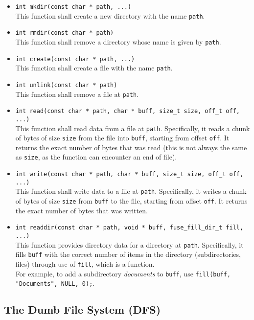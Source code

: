 \documentclass [a4,twoside,11pt] {article}
\begin{document}
    \begin{itemize}
        \item \texttt{int mkdir(const char * path, ...)}\\
        This function shall create a new directory with the name \texttt{path}.
        \item \texttt{int rmdir(const char * path)}\\
        This function shall remove a directory whose name is given by \texttt{path}.
        \item \texttt{int create(const char * path, ...)}\\
        This function shall create a file with the name \texttt{path}.
        \item \texttt{int unlink(const char * path)}\\
        This function shall remove a file at \texttt{path}.
        \item \texttt{int read(const char * path, char * buff, size\_t size, off\_t off, ...)}\\
        This function shall read data from a file at \texttt{path}. Specifically, it reads a chunk of bytes of size \texttt{size} from the file into \texttt{buff}, starting from offset \texttt{off}. It returns the exact number of bytes that was read (this is not always the same as \texttt{size}, as the function can encounter an end of file).
        \item \texttt{int write(const char * path, char * buff, size\_t size, off\_t off, ...)}\\
        This function shall write data to a file at \texttt{path}. Specifically, it writes a chunk of bytes of size \texttt{size} from \texttt{buff} to the file, starting from offset \texttt{off}. It returns the exact number of bytes that was written.
        \item \texttt{int readdir(const char * path, void * buff, fuse\_fill\_dir\_t fill, ...)}\\
        This function provides directory data for a directory at \texttt{path}. Specifically, it fills \texttt{buff} with the correct number of items in the directory (subdirectories, files) through use of \texttt{fill}, which is a function.\\
        For example, to add a subdirectory \textit{documents} to \texttt{buff}, use \texttt{fill(buff, "Documents", NULL, 0);}.
    \end{itemize}

    \subsection{The Dumb File System (DFS)}
\end{document}

